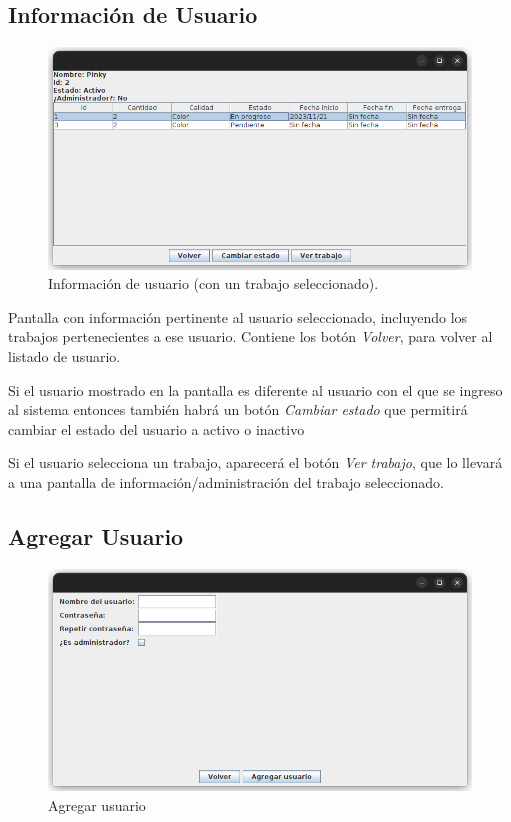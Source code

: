 \documentclass{article}
\begin{document}
\newpage

\subsection{Información de Usuario}

\begin{figure}[h]
    \centering
    \includegraphics[width=0.7\linewidth,keepaspectratio]{user-info.png}
    \caption{Información de usuario (con un trabajo seleccionado).}
\end{figure}

Pantalla con información pertinente al usuario seleccionado, incluyendo los trabajos pertenecientes a ese usuario. Contiene los botón \emph{Volver}, para volver al listado de usuario.

Si el usuario mostrado en la pantalla es diferente al usuario con el que se ingreso al sistema entonces también habrá un botón \emph{Cambiar estado} que permitirá cambiar el estado del usuario a activo o inactivo

Si el usuario selecciona un trabajo, aparecerá el botón \emph{Ver trabajo}, que lo llevará a una pantalla de información/administración del trabajo seleccionado.

\subsection{Agregar Usuario}

\begin{figure}[h]
    \centering
    \includegraphics[width=0.7\linewidth,keepaspectratio]{add-user.png}
    \caption{Agregar usuario}
\end{figure}
\end{document}
